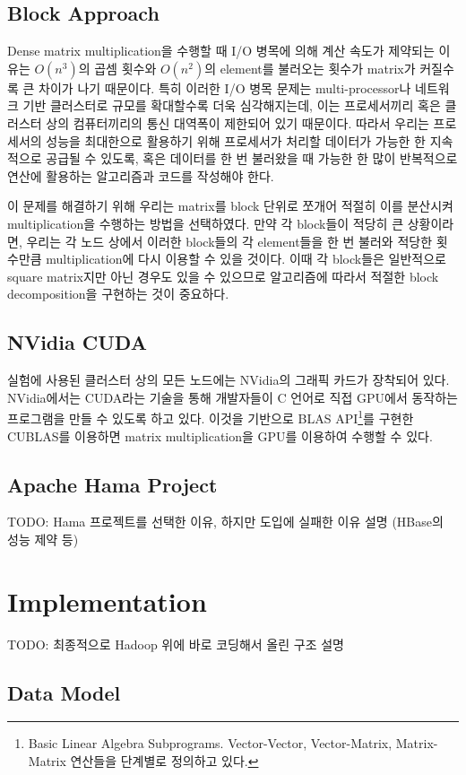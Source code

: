 \documentclass[a4paper]{article}
\begin{document}
\begin{multicols}{2}
\subsection{Block Approach}
Dense matrix multiplication을 수행할 때 I/O 병목에 의해 계산 속도가 제약되는 이유는 $O(n^3)$의 곱셈 횟수와 $O(n^2)$의 element를 불러오는 횟수가 matrix가 커질수록 큰 차이가 나기 때문이다.
특히 이러한 I/O 병목 문제는 multi-processor나 네트워크 기반 클러스터로 규모를 확대할수록 더욱 심각해지는데, 이는 프로세서끼리 혹은 클러스터 상의 컴퓨터끼리의 통신 대역폭이 제한되어 있기 때문이다.
따라서 우리는 프로세서의 성능을 최대한으로 활용하기 위해 프로세서가 처리할 데이터가 가능한 한 지속적으로 공급될 수 있도록, 혹은 데이터를 한 번 불러왔을 때 가능한 한 많이 반복적으로 연산에 활용하는 알고리즘과 코드를 작성해야 한다.

이 문제를 해결하기 위해 우리는 matrix를 block 단위로 쪼개어 적절히 이를 분산시켜 multiplication을 수행하는 방법을 선택하였다.
만약 각 block들이 적당히 큰 상황이라면, 우리는 각 노드 상에서 이러한 block들의 각 element들을 한 번 불러와 적당한 횟수만큼 multiplication에 다시 이용할 수 있을 것이다.
이때 각 block들은 일반적으로 square matrix지만 아닌 경우도 있을 수 있으므로 알고리즘에 따라서 적절한 block decomposition을 구현하는 것이 중요하다.

\subsection{NVidia CUDA}
실험에 사용된 클러스터 상의 모든 노드에는 NVidia의 그래픽 카드가 장착되어 있다.
NVidia에서는 CUDA라는 기술을 통해 개발자들이 C 언어로 직접 GPU에서 동작하는 프로그램을 만들 수 있도록 하고 있다.
이것을 기반으로 BLAS API\footnote{Basic Linear Algebra Subprograms. Vector-Vector, Vector-Matrix, Matrix-Matrix 연산들을 단계별로 정의하고 있다.}를 구현한 CUBLAS를 이용하면 matrix multiplication을 GPU를 이용하여 수행할 수 있다.

\subsection{Apache Hama Project}
TODO: Hama 프로젝트를 선택한 이유, 하지만 도입에 실패한 이유 설명 (HBase의 성능 제약 등)

\section{Implementation}
TODO: 최종적으로 Hadoop 위에 바로 코딩해서 올린 구조 설명
\subsection{Data Model}

\end{multicols}
\end{document}
